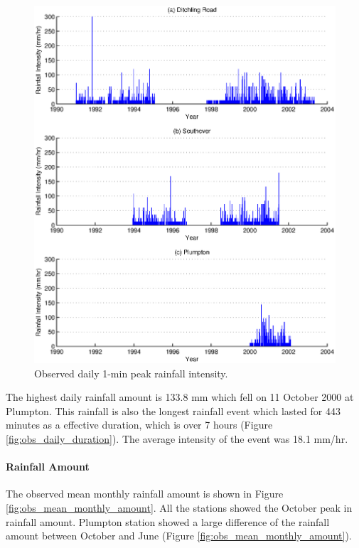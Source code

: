 \begin{figure}[htbp]
  \centering
    \includegraphics[width=1.0\textwidth]{./img/obs_daily_peak_int}
  \caption[Observed daily 1-min peak rainfall intensity]{Observed daily
1-min peak rainfall intensity.}
  \label{fig:obs_daily_peak_int}
\end{figure}

The highest daily rainfall amount is 133.8 mm which fell on 11 October 2000 at
Plumpton. This rainfall is also the longest rainfall event which lasted for 443
minutes as a effective duration, which is over 7 hours (Figure
\ref{fig:obs_daily_duration}). The average intensity of the event was 18.1
mm/hr.

\paragraph{Rainfall Amount}
\label{sec:RainfallAmount}

The observed mean monthly rainfall amount is shown in Figure
\ref{fig:obs_mean_monthly_amount}. All the stations showed the October peak in
rainfall amount. Plumpton station showed a large difference of the rainfall
amount between October and June (Figure \ref{fig:obs_mean_monthly_amount}).

